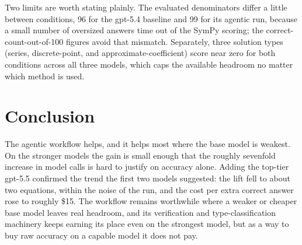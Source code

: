 \documentclass[11pt]{article}
\begin{document}
Two limits are worth stating plainly. The evaluated denominators differ a little
between conditions, 96 for the gpt-5.4 baseline and 99 for its agentic run,
because a small number of oversized answers time out of the SymPy scoring; the
correct-count-out-of-100 figures avoid that mismatch. Separately, three solution
types (series, discrete-point, and approximate-coefficient) score near zero for
both conditions across all three models, which caps the available headroom no
matter which method is used.

\section{Conclusion}
The agentic workflow helps, and it helps most where the base model is weakest.
On the stronger models the gain is small enough that the roughly sevenfold
increase in model calls is hard to justify on accuracy alone. Adding the
top-tier gpt-5.5 confirmed the trend the first two models suggested: the lift
fell to about two equations, within the noise of the run, and the cost per extra
correct answer rose to roughly \$15. The workflow remains worthwhile where a
weaker or cheaper base model leaves real headroom, and its verification and
type-classification machinery keeps earning its place even on the strongest
model, but as a way to buy raw accuracy on a capable model it does not pay.
\end{document}
